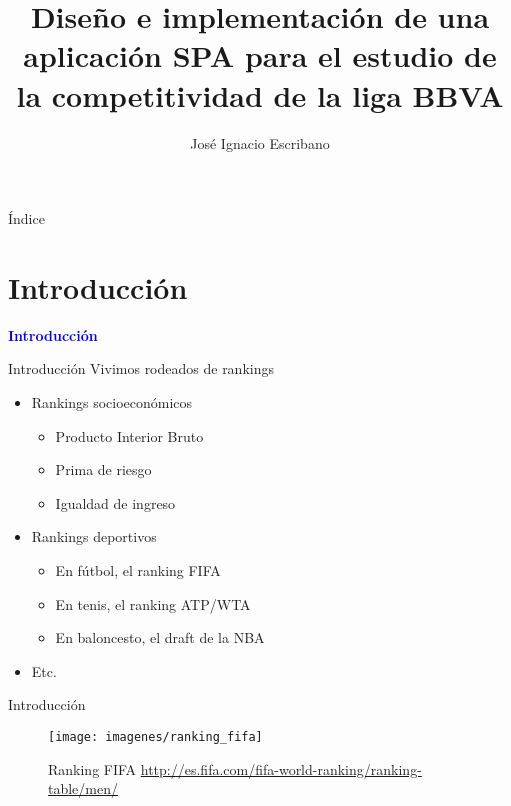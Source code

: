\documentclass[10pt]{beamer}
\author{José Ignacio Escribano}
\title{Diseño e implementación de una aplicación SPA para el estudio de la competitividad de la liga BBVA}
\institute[URJC]{\texttt{[image: imagenes/logoURJC.jpg]}}
\begin{document}
	
	\begin{frame}
		\maketitle
	\end{frame}

	\begin{frame}[allowframebreaks]{Índice}
		\tableofcontents
	\end{frame}
	
	
	\section{Introducción}
	
	\begin{frame}
		\begin{center}
			\Huge\textbf{\textsf{\textcolor{blue}{Introducción}}}
		\end{center}
	\end{frame}
	
	\begin{frame}{Introducción}
		Vivimos rodeados de rankings
		
		\begin{itemize}
			\item Rankings socioeconómicos
			\begin{itemize}
				\item Producto Interior Bruto
				\item Prima de riesgo
				\item Igualdad de ingreso
			\end{itemize}
			\item Rankings deportivos
			\begin{itemize}
				\item En fútbol, el ranking FIFA
				\item En tenis, el ranking ATP/WTA
				\item En baloncesto, el draft de la NBA
			\end{itemize}
			\item Etc.
		\end{itemize}
	\end{frame}
	
	\begin{frame}{Introducción}
		\begin{figure}
			\centering
			\texttt{[image: imagenes/ranking\_fifa]}
			\caption{Ranking FIFA \url{http://es.fifa.com/fifa-world-ranking/ranking-table/men/}}
			\label{fig:ranking_fifa}
		\end{figure}
	\end{frame}
	
\end{document}
